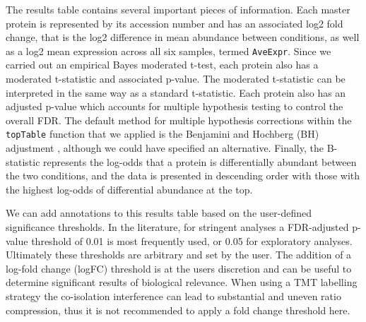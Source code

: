 \documentclass[9pt,a4paper,]{extarticle}
\newenvironment{Shaded}{\begin{snugshade}}{\end{snugshade}}
\newcommand{\DecValTok}[1]{\textcolor[rgb]{0.00,0.00,0.81}{#1}}
\newcommand{\DocumentationTok}[1]{\textcolor[rgb]{0.56,0.35,0.01}{\textbf{\textit{#1}}}}
\newcommand{\FloatTok}[1]{\textcolor[rgb]{0.00,0.00,0.81}{#1}}
\newcommand{\FunctionTok}[1]{\textcolor[rgb]{0.13,0.29,0.53}{\textbf{#1}}}
\newcommand{\NormalTok}[1]{#1}
\newcommand{\OtherTok}[1]{\textcolor[rgb]{0.56,0.35,0.01}{#1}}
\newcommand{\SpecialCharTok}[1]{\textcolor[rgb]{0.81,0.36,0.00}{\textbf{#1}}}
\newcommand{\StringTok}[1]{\textcolor[rgb]{0.31,0.60,0.02}{#1}}
\begin{document}
The results table contains several important pieces of information. Each master
protein is represented by its accession number and has an associated log2 fold
change, that is the log2 difference in mean abundance between conditions, as
well as a log2 mean expression across all six samples, termed \texttt{AveExpr}. Since we
carried out an empirical Bayes moderated t-test, each protein also has a
moderated t-statistic and associated p-value. The moderated t-statistic can be
interpreted in the same way as a standard t-statistic. Each protein also has an
adjusted p-value which accounts for multiple hypothesis testing to control the
overall FDR. The default method for multiple hypothesis corrections within the
\texttt{topTable} function that we applied is the Benjamini and Hochberg (BH)
adjustment \citep{BH1995}, although we could have specified an alternative. Finally,
the B-statistic represents the log-odds that a protein is differentially abundant
between the two conditions, and the data is presented in descending order with
those with the highest log-odds of differential abundance at the top.

We can add annotations to this results table based on the user-defined
significance thresholds. In the literature, for stringent analyses a
FDR-adjusted p-value threshold of 0.01 is most frequently used, or 0.05 for
exploratory analyses. Ultimately these thresholds are arbitrary and set by the
user. The addition of a log-fold change (logFC) threshold is at the users
discretion and can be useful to determine significant results of biological
relevance. When using a TMT labelling strategy the co-isolation interference can
lead to substantial and uneven ratio compression, thus it is not recommended to
apply a fold change threshold here.

\begin{Shaded}
\end{Shaded}
\end{document}
